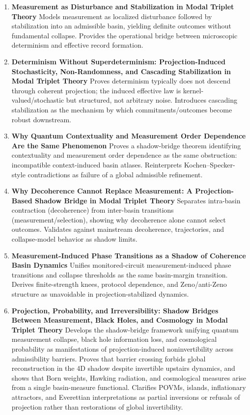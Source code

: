 \documentclass[11pt]{article}
\begin{document}
\begin{enumerate}[leftmargin=*]

\item \textbf{Measurement as Disturbance and Stabilization in Modal Triplet Theory} Models measurement as localized disturbance followed by stabilization into an admissible basin, yielding definite outcomes without fundamental collapse. Provides the operational bridge between microscopic determinism and effective record formation.
\item \textbf{Determinism Without Superdeterminism: Projection-Induced Stochasticity, Non-Randomness, and Cascading Stabilization in Modal Triplet Theory} Proves determinism typically does not descend through coherent projection; the induced effective law is kernel-valued/stochastic but structured, not arbitrary noise. Introduces cascading stabilization as the mechanism by which commitments/outcomes become robust downstream.

\item \textbf{Why Quantum Contextuality and Measurement Order Dependence Are the Same Phenomenon} Proves a shadow-bridge theorem identifying contextuality and measurement order dependence as the same obstruction: incompatible context-induced basin atlases. Reinterprets Kochen–Specker-style contradictions as failure of a global admissible refinement.
\item \textbf{Why Decoherence Cannot Replace Measurement: A Projection-Based Shadow Bridge in Modal Triplet Theory} Separates intra-basin contraction (decoherence) from inter-basin transitions (measurement/selection), showing why decoherence alone cannot select outcomes. Validates against mainstream decoherence, trajectories, and collapse-model behavior as shadow limits.
\item \textbf{Measurement-Induced Phase Transitions as a Shadow of Coherence Basin Dynamics} Unifies monitored-circuit measurement-induced phase transitions and collapse thresholds as the same basin-margin transition. Derives finite-strength knees, protocol dependence, and Zeno/anti-Zeno structure as unavoidable in projection-stabilized dynamics.

\item \textbf{Projection, Probability, and Irreversibility: Shadow Bridges Between Measurement, Black Holes, and Cosmology in Modal Triplet Theory} 
Develops the shadow-bridge framework unifying quantum measurement collapse, black hole information loss, and cosmological probability as manifestations of projection-induced noninvertibility across admissibility barriers. Proves that barrier crossing forbids global reconstruction in the 4D shadow despite invertible upstairs dynamics, and shows that Born weights, Hawking radiation, and cosmological measures arise from a single basin-measure functional. Clarifies POVMs, islands, inflationary attractors, and Everettian interpretations as partial inversions or refusals of projection rather than restorations of global invertibility.


\end{enumerate}
\end{document}
